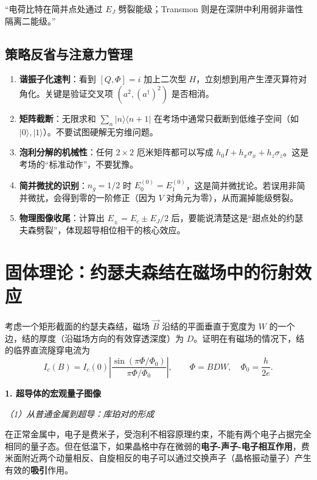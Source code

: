 \begin{tipbox}[解题金句]
``电荷比特在简并点处通过 $E_J$ 劈裂能级；Transmon 则是在深阱中利用弱非谐性隔离二能级。''
\end{tipbox}

\subsection{策略反省与注意力管理}

\begin{enumerate}[nosep]
    \item \textbf{谐振子化速判}：看到 $[Q, \Phi]=i$ 加上二次型 $H$，立刻想到用产生湮灭算符对角化。关键是验证交叉项 $(a^2, (a^\dagger)^2)$ 是否相消。
    \item \textbf{矩阵截断}：无限求和 $\sum_n |n\rangle\langle n+1|$ 在考场中通常只截断到低维子空间（如 $|0\rangle, |1\rangle$）。不要试图硬解无穷维问题。
    \item \textbf{泡利分解的机械性}：任何 $2\times 2$ 厄米矩阵都可以写成 $h_0 I + h_x \sigma_x + h_z \sigma_z$。这是考场的``标准动作''，不要犹豫。
    \item \textbf{简并微扰的识别}：$n_g=1/2$ 时 $E_0^{(0)}=E_1^{(0)}$，这是简并微扰论。若误用非简并微扰，会得到零的一阶修正（因为 $V$ 对角元为零），从而漏掉能级劈裂。
    \item \textbf{物理图像收尾}：计算出 $E_\pm = E_c \pm E_J/2$ 后，要能说清楚这是``甜点处的约瑟夫森劈裂''，体现超导相位相干的核心效应。
\end{enumerate}

\newpage
\newpage
\section{固体理论：约瑟夫森结在磁场中的衍射效应}

\begin{modelbox}
考虑一个矩形截面的约瑟夫森结，磁场 $\vec{B}$ 沿结的平面垂直于宽度为 $W$ 的一个边，结的厚度（沿磁场方向的有效穿透深度）为 $D$。证明在有磁场的情况下，结的临界直流隧穿电流为
\[
I_c(B) = I_c(0)\left| \frac{\sin(\pi\Phi/\Phi_0)}{\pi\Phi/\Phi_0} \right|,
\qquad \Phi = BDW, \quad \Phi_0 = \frac{h}{2e}.
\]
\end{modelbox}

\textbf{1. 超导体的宏观量子图像}

\textit{（1）从普通金属到超导：库珀对的形成}

在正常金属中，电子是费米子，受泡利不相容原理约束，不能有两个电子占据完全相同的量子态。但在低温下，如果晶格中存在微弱的\textbf{电子-声子-电子相互作用}，费米面附近两个动量相反、自旋相反的电子可以通过交换声子（晶格振动量子）产生有效的\textbf{吸引}作用。

